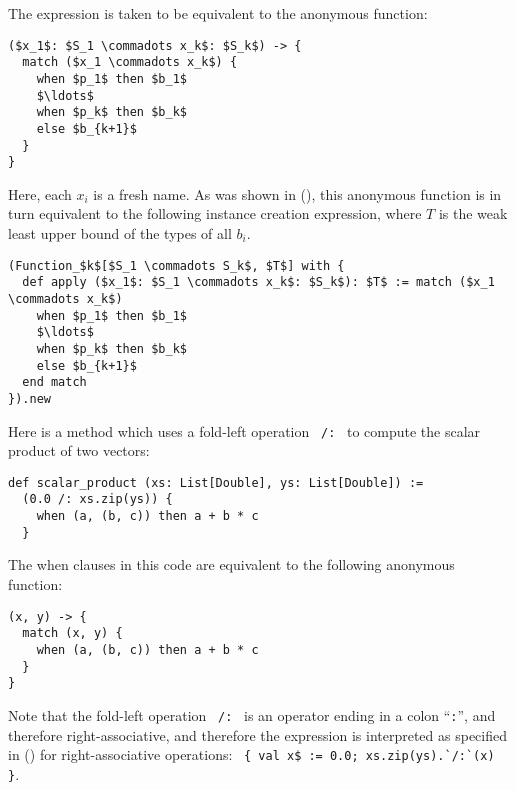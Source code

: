 The expression is taken to be equivalent to the anonymous function:
\begin{lstlisting}
($x_1$: $S_1 \commadots x_k$: $S_k$) -> {
  match ($x_1 \commadots x_k$) {
    when $p_1$ then $b_1$
    $\ldots$
    when $p_k$ then $b_k$
    else $b_{k+1}$
  }
}
\end{lstlisting}

Here, each $x_i$ is a fresh name. As was shown in (), this anonymous function is in turn equivalent to the following instance creation expression, where $T$ is the weak least upper bound of the types of all $b_i$. 

\begin{lstlisting}
(Function_$k$[$S_1 \commadots S_k$, $T$] with {
  def apply ($x_1$: $S_1 \commadots x_k$: $S_k$): $T$ := match ($x_1 \commadots x_k$)
    when $p_1$ then $b_1$
    $\ldots$
    when $p_k$ then $b_k$
    else $b_{k+1}$
  end match
}).new
\end{lstlisting}

\example Here is a method which uses a fold-left operation ~\lstinline!/:!~ to compute the scalar product of two vectors:
\begin{lstlisting}
def scalar_product (xs: List[Double], ys: List[Double]) := 
  (0.0 /: xs.zip(ys)) {
    when (a, (b, c)) then a + b * c
  }
\end{lstlisting}
The when clauses in this code are equivalent to the following anonymous function:
\begin{lstlisting}
(x, y) -> { 
  match (x, y) {
    when (a, (b, c)) then a + b * c
  }
}
\end{lstlisting}
Note that the fold-left operation ~\lstinline!/:!~ is an operator ending in a colon ``\lstinline!:!'', and therefore right-associative, and therefore the expression is interpreted as specified in () for right-associative operations: ~\lstinline[mathescape=false]!{ val x$ := 0.0; xs.zip(ys).`/:`(x) }!. 











